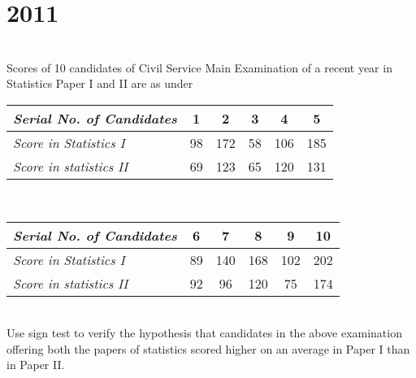 \section*{2011}
\vspace{-.5cm}
\hrulefill \smallskip\\
 Scores of 10 candidates of Civil Service Main Examination of a recent year in Statistics Paper I and II are as under
\begin{table}[htbp]
\centering
    \begin{tabular}{|l|*{5}{c|}} \hline
        \emph{Serial No. of Candidates} & 1 & 2 & 3 & 4 & 5  \\ \hline
        \emph{Score in Statistics I} & 98 & 172 & 58 & 106 & 185 \\ \hline
        \emph{Score in statistics II} & 69 & 123 & 65 & 120 & 131 \\\hline
    \end{tabular} \\\vspace{.3cm}
    \begin{tabular}{|l|*{5}{c|}} \hline
         \emph{Serial No. of Candidates}& 6 & 7 & 8 & 9 & 10  \\ \hline
        \emph{Score in Statistics I} & 89 & 140 & 168 & 102 & 202 \\ \hline
        \emph{Score in statistics II} & 92 & 96 & 120 & 75 & 174 \\\hline
    \end{tabular}
\end{table}\\
Use sign test to verify the hypothesis that candidates in the above examination offering both the papers of statistics scored higher on an average in Paper I than in Paper II.